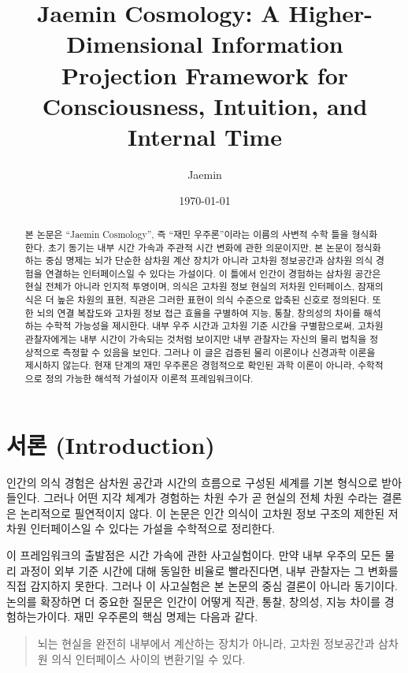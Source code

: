\documentclass[11pt]{article}
\title{Jaemin Cosmology: A Higher-Dimensional Information Projection Framework for Consciousness, Intuition, and Internal Time}
\author{Jaemin}
\date{\today}
\theoremstyle{remark}
\begin{document}
\maketitle

\begin{abstract}
본 논문은 ``Jaemin Cosmology'', 즉 ``재민 우주론''이라는 이름의 사변적 수학
틀을 형식화한다. 초기 동기는 내부 시간 가속과 주관적 시간 변화에 관한
의문이지만, 본 논문이 정식화하는 중심 명제는 뇌가 단순한 삼차원 계산 장치가
아니라 고차원 정보공간과 삼차원 의식 경험을 연결하는 인터페이스일 수
있다는 가설이다. 이 틀에서 인간이 경험하는 삼차원 공간은 현실 전체가 아니라
인지적 투영이며, 의식은 고차원 정보 현실의 저차원 인터페이스, 잠재의식은
더 높은 차원의 표현, 직관은 그러한 표현이 의식 수준으로 압축된 신호로
정의된다. 또한 뇌의 연결 복잡도와 고차원 정보 접근 효율을 구별하여 지능,
통찰, 창의성의 차이를 해석하는 수학적 가능성을 제시한다. 내부 우주 시간과
고차원 기준 시간을 구별함으로써, 고차원 관찰자에게는 내부 시간이 가속되는
것처럼 보이지만 내부 관찰자는 자신의 물리 법칙을 정상적으로 측정할 수
있음을 보인다. 그러나 이 글은 검증된 물리 이론이나 신경과학 이론을
제시하지 않는다. 현재 단계의 재민 우주론은 경험적으로 확인된 과학 이론이
아니라, 수학적으로 정의 가능한 해석적 가설이자 이론적 프레임워크이다.
\end{abstract}

\tableofcontents

\section{서론 (Introduction)}

인간의 의식 경험은 삼차원 공간과 시간의 흐름으로 구성된 세계를 기본
형식으로 받아들인다. 그러나 어떤 지각 체계가 경험하는 차원 수가 곧 현실의
전체 차원 수라는 결론은 논리적으로 필연적이지 않다. 이 논문은 인간
의식이 고차원 정보 구조의 제한된 저차원 인터페이스일 수 있다는 가설을
수학적으로 정리한다.

이 프레임워크의 출발점은 시간 가속에 관한 사고실험이다. 만약 내부 우주의
모든 물리 과정이 외부 기준 시간에 대해 동일한 비율로 빨라진다면, 내부
관찰자는 그 변화를 직접 감지하지 못한다. 그러나 이 사고실험은 본 논문의
중심 결론이 아니라 동기이다. 논의를 확장하면 더 중요한 질문은 인간이
어떻게 직관, 통찰, 창의성, 지능 차이를 경험하는가이다. 재민 우주론의 핵심
명제는 다음과 같다.

\begin{quote}
뇌는 현실을 완전히 내부에서 계산하는 장치가 아니라, 고차원 정보공간과
삼차원 의식 인터페이스 사이의 변환기일 수 있다.
\end{quote}
\end{document}

